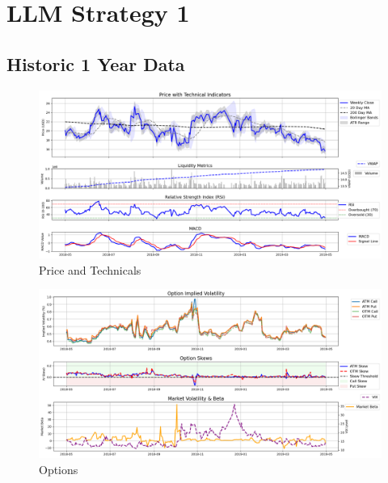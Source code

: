 \documentclass[8pt]{scrartcl}
\begin{document}
\newpage

\section*{LLM Strategy 1}
\label{app:s1}

\subsection*{Historic 1 Year Data}

\begin{figure}[H]
    \centering
    \includegraphics[width=1\linewidth]{judge_reviews//TSLA_M_gpt-4o-mini//2019-05-01/judge_Price_with_Technical_Indicators.png}
    \caption{Price and Technicals}
\end{figure}

\begin{figure}[H]
    \centering
    \includegraphics[width=1\linewidth]{judge_reviews/TSLA_M_gpt-4o-mini/2019-05-01/judge_Option_Implied_Volatility.png}
    \caption{Options}
\end{figure}
\end{document}
